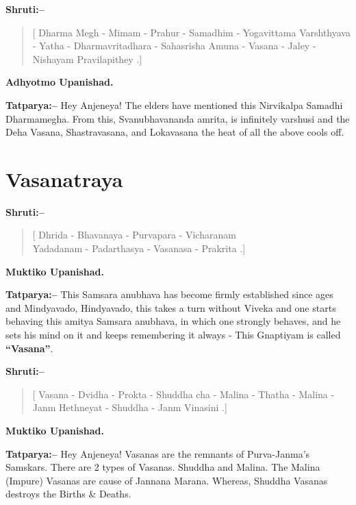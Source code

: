 \textbf{Shruti:–}

\begin{verse}
[ Dharma Megh - Mimam - Prahur - Samadhim - Yogavittama  Varshthyava - Yatha - Dharmavritadhara - Sahasrisha  Amuna - Vasana - Jaley - Nishayam Pravilapithey .]
\end{verse}

\begin{flushright}
\textbf{Adhyotmo Upanishad.}
\end{flushright}

\textbf{Tatparya:–} Hey Anjeneya! The elders have mentioned this Nirvikalpa Samadhi Dharmamegha. From this, Svanubhavananda amrita, is infinitely varshusi and the Deha Vasana, Shastravasana, and Lokavasana the heat of all the above cools off.

\chapter{Vasanatraya}

\textbf{Shruti:–}

\begin{verse}
[ Dhrida - Bhavanaya - Purvapara - Vicharanam \\ Yadadanam - Padarthasya - Vasanasa - Prakrita .]
\end{verse}

\begin{flushright}
\textbf{Muktiko Upanishad.}
\end{flushright}

\textbf{Tatparya:–} This Samsara anubhava has become firmly established since ages and Mindyavado, Hindyavado, this takes a turn without Viveka and one starts behaving this amitya Samsara anubhava, in which one strongly behaves, and he sets his mind on it and keeps remembering it always - This Gnaptiyam is called \textbf{“Vasana”}.

\textbf{Shruti:–}

\begin{verse}
[ Vasana - Dvidha - Prokta - Shuddha cha - Malina - Thatha -  Malina - Janm Hethneyat - Shuddha - Janm Vinasini .]
\end{verse}

\begin{flushright}
\textbf{Muktiko Upanishad.}
\end{flushright}

\textbf{Tatparya:–} Hey Anjeneya! Vasanas are the remnants of Purva-Janma's Samskars. There are 2 types of Vasanas. Shuddha and Malina. The Malina (Impure) Vasanas are cause of Jannana Marana. Whereas, Shuddha Vasanas destroys the Births \& Deaths.

